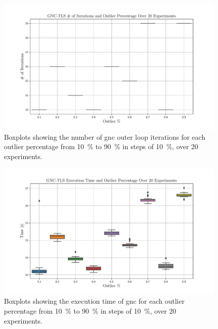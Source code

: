\begin{figure}[!h]
	\begin{center}
		\includegraphics[width=\textwidth]{chapters/2-pose-estimation/fig/GNC-TLS-iterations-e.pdf}
	\end{center}
	\caption{Boxplots showing the number of \gls{gnc} outer loop iterations for each outlier percentage from \SI{10}{\percent} to \SI{90}{\percent} in steps of \SI{10}{\percent}, over \num{20} experiments. }
	\label{fig:GNC-TLS-iterations-e}
\end{figure}

\begin{figure}[!h]
	\begin{center}
		\includegraphics[width=\textwidth]{chapters/2-pose-estimation/fig/GNC-TLS-time-e.pdf}
	\end{center}
	\caption{Boxplots showing the execution time of \gls{gnc} for each outlier percentage from \SI{10}{\percent} to \SI{90}{\percent} in steps of \SI{10}{\percent}, over \num{20} experiments.}
	\label{fig:GNC-TLS-time-e}
\end{figure}

